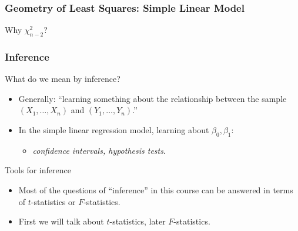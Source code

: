\documentclass[handout]{beamer}
\begin{document}

   \begin{frame} \frametitle{Geometry of Least Squares: Simple Linear Model}


   \begin{center}
   Why $\chi^2_{n-2}$?
   \end{center}
   \end{frame}


   \begin{frame} \frametitle{Inference}

   \begin{block}
   {What do we mean by inference?}
   \begin{itemize}[<+->]
   \item Generally: ``learning something about
   the relationship between the sample $(X_1, \dots, X_n)$ and $(Y_1, \dots, Y_n)$.''

   \item In the simple linear regression model, learning about $\beta_0, \beta_1$:
   \begin{itemize}
   \item {\em confidence intervals, hypothesis tests}.
   \end{itemize}
   \end{itemize}
   \end{block}
   \begin{block}
   {Tools for inference}
   \begin{itemize}[<+->]
   \item Most of the questions of ``inference'' in this course
   can be answered in terms of $t$-statistics or $F$-statistics.

   \item First we will talk about $t$-statistics, later $F$-statistics.
   \end{itemize}
   \end{block}
   \end{frame}

\end{document}
